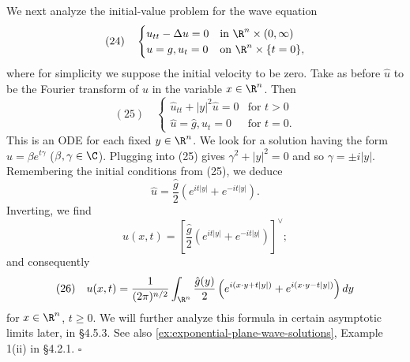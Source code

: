 \begin{example}
\label{ex:fourier-transform-wave-equation}
We next analyze the initial-value problem for the wave equation
$$(24) \quad \begin{cases} u_{tt} - \Delta u = 0 & \text{in } \R^n \times (0,\infty) \\ u = g, u_t = 0 & \text{on } \R^n \times \{t = 0\}, \end{cases}$$
where for simplicity we suppose the initial velocity to be zero. Take as before $\hat{u}$ to be the Fourier transform of $u$ in the variable $x \in \R^n$. Then
$$(25) \quad \begin{cases} \hat{u}_{tt} + |y|^2 \hat{u} = 0 & \text{for } t > 0 \\ \hat{u} = \hat{g}, \hat{u}_t = 0 & \text{for } t = 0. \end{cases}$$
This is an ODE for each fixed $y\in\R^n$. We look for a solution having the form $\hat u = \beta e^{t\gamma}$ ($\beta,\gamma\in\C$). Plugging into (25) gives $\gamma^2+|y|^2=0$ and so $\gamma=\pm i|y|$. Remembering the initial conditions from (25), we deduce
$$\hat u = \frac{\hat g}{2}(e^{it|y|}+e^{-it|y|}).$$
Inverting, we find
$$u(x,t) = \left[\frac{\hat g}{2}(e^{it|y|}+e^{-it|y|})\right]^\vee;$$
and consequently
$$(26) \quad u(x,t) = \frac{1}{(2\pi)^{n/2}}\int_{\R^n} \frac{\hat g(y)}{2}\left(e^{i(x\cdot y+t|y|)}+e^{i(x\cdot y-t|y|)}\right)dy$$
for $x\in\R^n$, $t\ge 0$. We will further analyze this formula in certain asymptotic limits later, in \S4.5.3. See also \cref{ex:exponential-plane-wave-solutions}, Example 1(ii) in \S4.2.1. $\square$
\end{example}


